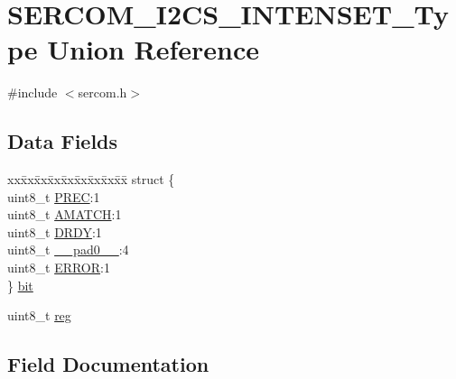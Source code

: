 \hypertarget{union_s_e_r_c_o_m___i2_c_s___i_n_t_e_n_s_e_t___type}{}\section{S\+E\+R\+C\+O\+M\+\_\+\+I2\+C\+S\+\_\+\+I\+N\+T\+E\+N\+S\+E\+T\+\_\+\+Type Union Reference}
\label{union_s_e_r_c_o_m___i2_c_s___i_n_t_e_n_s_e_t___type}


{\ttfamily \#include $<$sercom.\+h$>$}

\subsection*{Data Fields}
\begin{DoxyCompactItemize}
\item 
\begin{tabbing}
xx\=xx\=xx\=xx\=xx\=xx\=xx\=xx\=xx\=\kill
struct \{\\
\>uint8\_t \mbox{\hyperlink{union_s_e_r_c_o_m___i2_c_s___i_n_t_e_n_s_e_t___type_a0a58b5fb217cc2964590994ae435b2f4}{PREC}}:1\\
\>uint8\_t \mbox{\hyperlink{union_s_e_r_c_o_m___i2_c_s___i_n_t_e_n_s_e_t___type_ab699ad93435d97fc3aedd27daf8f3d20}{AMATCH}}:1\\
\>uint8\_t \mbox{\hyperlink{union_s_e_r_c_o_m___i2_c_s___i_n_t_e_n_s_e_t___type_a37b5281f35b36c2887d5fc0d5dc9a444}{DRDY}}:1\\
\>uint8\_t \mbox{\hyperlink{union_s_e_r_c_o_m___i2_c_s___i_n_t_e_n_s_e_t___type_a8b4eebe79ded0459acec2f4950102ba3}{\_\_pad0\_\_}}:4\\
\>uint8\_t \mbox{\hyperlink{union_s_e_r_c_o_m___i2_c_s___i_n_t_e_n_s_e_t___type_a4be51829c8720b7d159b77c39924afaa}{ERROR}}:1\\
\} \mbox{\hyperlink{union_s_e_r_c_o_m___i2_c_s___i_n_t_e_n_s_e_t___type_a2240d5a46bb3681d952bb3c5514ac1d1}{bit}}\\

\end{tabbing}\item 
uint8\+\_\+t \mbox{\hyperlink{union_s_e_r_c_o_m___i2_c_s___i_n_t_e_n_s_e_t___type_a9428adc9af4653a2050e2536b55dec8d}{reg}}
\end{DoxyCompactItemize}


\subsection{Field Documentation}
\mbox{\label{union_s_e_r_c_o_m___i2_c_s___i_n_t_e_n_s_e_t___type_a8b4eebe79ded0459acec2f4950102ba3}} 

